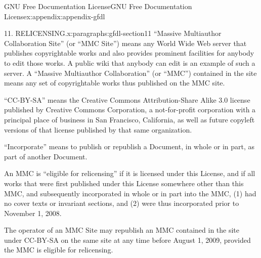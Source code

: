 \documentclass[oneside,10pt,]{book}
\numberwithin{equation}{chapter}
\begin{document}
\begin{appendixptx}{GNU Free Documentation License}{}{GNU Free Documentation License}{}{}{x:appendix:appendix-gfdl}
\begin{paragraphs}{11. RELICENSING.}{x:paragraphs:gfdl-section11}
``Massive Multiauthor Collaboration Site'' (or ``MMC Site'') means any World Wide Web server that publishes copyrightable works and also provides prominent facilities for anybody to edit those works. A public wiki that anybody can edit is an example of such a server. A ``Massive Multiauthor Collaboration'' (or ``MMC'') contained in the site means any set of copyrightable works thus published on the MMC site.%
\par
``CC-BY-SA'' means the Creative Commons Attribution-Share Alike 3.0 license published by Creative Commons Corporation, a not-for-profit corporation with a principal place of business in San Francisco, California, as well as future copyleft versions of that license published by that same organization.%
\par
``Incorporate'' means to publish or republish a Document, in whole or in part, as part of another Document.%
\par
An MMC is ``eligible for relicensing'' if it is licensed under this License, and if all works that were first published under this License somewhere other than this MMC, and subsequently incorporated in whole or in part into the MMC, (1) had no cover texts or invariant sections, and (2) were thus incorporated prior to November 1, 2008.%
\par
The operator of an MMC Site may republish an MMC contained in the site under CC-BY-SA on the same site at any time before August 1, 2009, provided the MMC is eligible for relicensing.%
\end{paragraphs}%
\end{appendixptx}
%
%
\typeout{************************************************}
\typeout{************************************************}
%
\end{document}
